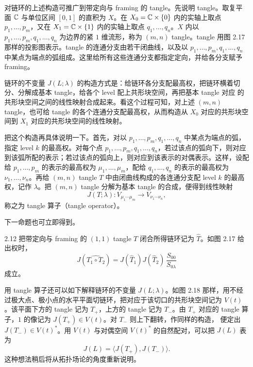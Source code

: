 对链环的上述构造可推广到带定向与 framing 的 tangle。先说明 tangle。取复平面 $\mathbb{C}$ 与单位区间 $[0,1]$ 的直积为 $X$。在 $X_0=\mathbb{C}\times\{0\}$ 内的实轴上取点 $p_1,\dots,p_m$，又在 $X_1=\mathbb{C}\times\{1\}$ 内的实轴上取点 $q_1,\dots,q_n$。$X$ 内以 $p_1,\dots,p_m,q_1,\dots,q_n$ 为边界的紧 $1$ 维流形，称为 $(m,n)$ tangle。tangle 用图 2.17 那样的投影图表示。tangle 的连通分支由若干闭曲线，以及以 $p_1,\dots,p_m,q_1,\dots,q_n$ 中某点为端点的弧组成。这里给所有这些连通分支都指定定向，并给各分支赋予 framing。

链环的不变量 $J(L;\lambda)$ 的构造方式是：给链环各分支配最高权，把链环横着切分、分解成基本 tangle，给各个 level 配上共形块空间，再把基本 tangle 对应
的共形块空间之间的线性映射合成起来。看这个过程可知，对上述 $(m,n)$ tangle，也可给 tangle 的各个连通分支配最高权，从而构造从 $X_0$ 对应的共形块空间到 $X_1$ 对应的共形块空间的线性映射。

把这个构造再具体说明一下。首先，对以 $p_1,\dots,p_m,q_1,\dots,q_n$ 中某点为端点的弧，指定 level $k$ 的最高权。对每个点 $p_1,\dots,p_m,q_1,\dots,q_n$，若过该点的弧向下，则对应到该弧所配的表示；若过该点的弧向上，则对应到该表示的对偶表示。这样，设配给 $p_1,\dots,p_m$ 的表示的最高权为 $\mu_1,\dots,\mu_m$，配给 $q_1,\dots,q_n$ 的表示的最高权为 $\nu_1,\dots,\nu_n$。再给 $(m,n)$ tangle $T$ 中由闭曲线构成的各连通分支配 level $k$ 的最高权，记作 $\lambda$。把 $(m,n)$ tangle 分解为基本 tangle 的合成，便得到线性映射
\begin{equation}
  J(T;\lambda): V_{\mu_1\cdots\mu_m}\longrightarrow V_{\nu_1\cdots\nu_n}, \tag{2.27}
\end{equation}
称之为 tangle 算子（tangle operator）。

下一命题也可立即得到。

\begin{proposition}{2.12}
  把带定向与 framing 的 $(1,1)$ tangle $T$ 闭合所得链环记为 $\hat T$。如图 2.17 给出权时，
  \[
    J(\widehat{T_1\circ T_2})=J(\hat T_1)J(\hat T_2)\,\frac{S_{00}}{S_{0\lambda}}
  \]
  成立。
\end{proposition}


用 tangle 算子还可以如下解释链环的不变量 $J(L;\lambda)$。如图 2.18 那样，用不经过极大点、极小点的水平平面切链环，把对应于该切口的共形块空间记为 $V(t)$。该平面下方的 tangle 记为 $T_+$，上方的 tangle 记为 $T_-$。由 $T_+$ 对应的 tangle 算子，$1$ 的像记为 $J(T_+)\in V(t)$。对 $T_-$ 则上下翻转，作同样的构造，
便定出 $J(T_-)\in V(t)^\ast$。用 $V(t)$ 与对偶空间 $V(t)^\ast$ 的自然配对，可以把 $J(L)$ 表为
\[
  J(L)=\langle J(T_+),J(T_-)\rangle.
\]
这种想法稍后将从拓扑场论的角度重新说明。

